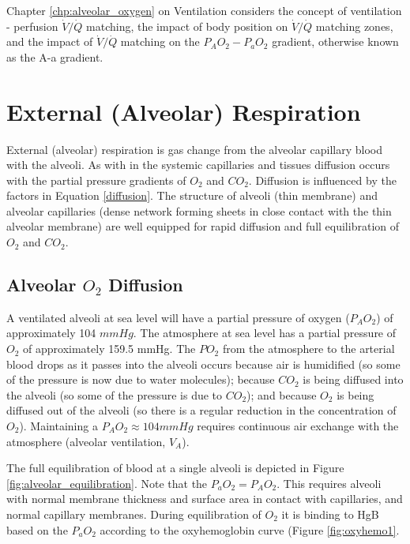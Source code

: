 Chapter \ref{chp:alveolar_oxygen} on Ventilation considers the concept of ventilation - perfusion $\dot{V}/\dot{Q}$ matching, the impact of body position on $\dot{V}/\dot{Q}$ matching zones, and the impact of $\dot{V}/\dot{Q}$ matching on the $P_AO_2-P_aO_2$ gradient, otherwise known as the A-a gradient.

\section{External (Alveolar) Respiration}

External (alveolar) respiration is gas change from the alveolar capillary blood with the alveoli. As with in the systemic capillaries and tissues diffusion occurs with the partial pressure gradients of $O_2$ and $CO_2$. Diffusion is influenced by the factors in Equation \ref{diffusion}. The structure of alveoli (thin membrane) and alveolar capillaries (dense network forming sheets in close contact with the thin alveolar membrane) are well equipped for rapid diffusion and full equilibration of $O_2$ and $CO_2$. 


\subsection{Alveolar $O_2$ Diffusion}

A ventilated alveoli at sea level will have a partial pressure of oxygen ($P_AO_2$) of approximately 104 $mmHg$. The atmosphere at sea level has a partial pressure of $O_2$ of approximately 159.5 mmHg. The $PO_2$ from the atmosphere to the arterial blood drops as it passes into the alveoli occurs because air is humidified (so some of the pressure is now due to water molecules); because $CO_2$ is being diffused into the alveoli (so some of the pressure is due to $CO_2$); and because $O_2$ is being diffused out of the alveoli (so there is a regular reduction in the concentration of $O_2$). Maintaining a $P_AO_2 \approx 104 mmHg$ requires continuous air exchange with the atmosphere (alveolar ventilation, $V_A$).

The full equilibration of blood at a single alveoli is depicted in Figure \ref{fig:alveolar_equilibration}. Note that the $P_aO_2 = P_AO_2$. This requires alveoli with normal membrane thickness and surface area in contact with capillaries, and normal capillary membranes. During equilibration of $O_2$ it is binding to HgB based on the $P_aO_2$ according to the oxyhemoglobin curve (Figure \ref{fig:oxyhemo1}. 

